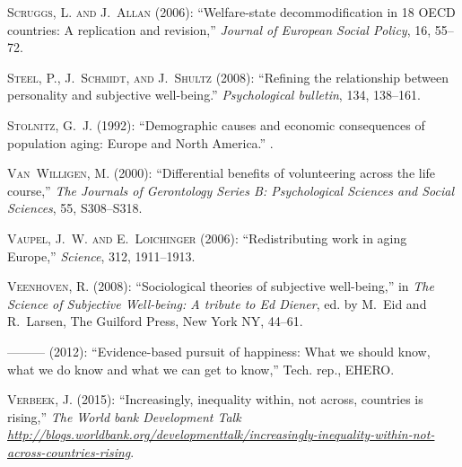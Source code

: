 \documentclass[10pt, letterpaper]{article}
\begin{document}
\begin{spacing}{1.4}
\begin{spacing}{.9}
\begin{thebibliography}{71}
\textsc{Scruggs, L. and J.~Allan} (2006): \enquote{Welfare-state
  decommodification in 18 OECD countries: A replication and revision,}
  \emph{Journal of European Social Policy}, 16, 55--72.

\textsc{Steel, P., J.~Schmidt, and J.~Shultz} (2008): \enquote{Refining the
  relationship between personality and subjective well-being.}
  \emph{Psychological bulletin}, 134, 138--161.

\textsc{Stolnitz, G.~J.} (1992): \enquote{Demographic causes and economic
  consequences of population aging: Europe and North America.} .

\textsc{Van~Willigen, M.} (2000): \enquote{Differential benefits of
  volunteering across the life course,} \emph{The Journals of Gerontology
  Series B: Psychological Sciences and Social Sciences}, 55, S308--S318.

\textsc{Vaupel, J.~W. and E.~Loichinger} (2006): \enquote{Redistributing work
  in aging Europe,} \emph{Science}, 312, 1911--1913.

\textsc{Veenhoven, R.} (2008): \enquote{Sociological theories of subjective
  well-being,} in \emph{The Science of Subjective Well-being: A tribute to Ed
  Diener}, ed. by M.~Eid and R.~Larsen, The Guilford Press, New York NY,
  44--61.

---\hspace{-.1pt}---\hspace{-.1pt}--- (2012): \enquote{Evidence-based pursuit
  of happiness: What we should know, what we do know and what we can get to
  know,} Tech. rep., EHERO.

\textsc{Verbeek, J.} (2015): \enquote{Increasingly, inequality within, not
  across, countries is rising,} \emph{The World bank Development Talk
  \url{http://blogs.worldbank.org/developmenttalk/increasingly-inequality-within-not-across-countries-rising}}.


\end{thebibliography}
\end{spacing}
\end{spacing}
\end{document}
